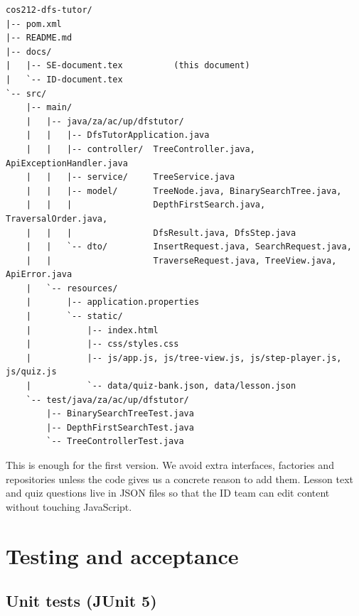 \documentclass[11pt,a4paper]{article}
\begin{document}
\begin{lstlisting}[basicstyle=\ttfamily\footnotesize, backgroundcolor=\color{codebg}, frame=single, rulecolor=\color{black!15}]
cos212-dfs-tutor/
|-- pom.xml
|-- README.md
|-- docs/
|   |-- SE-document.tex          (this document)
|   `-- ID-document.tex
`-- src/
    |-- main/
    |   |-- java/za/ac/up/dfstutor/
    |   |   |-- DfsTutorApplication.java
    |   |   |-- controller/  TreeController.java, ApiExceptionHandler.java
    |   |   |-- service/     TreeService.java
    |   |   |-- model/       TreeNode.java, BinarySearchTree.java,
    |   |   |                DepthFirstSearch.java, TraversalOrder.java,
    |   |   |                DfsResult.java, DfsStep.java
    |   |   `-- dto/         InsertRequest.java, SearchRequest.java,
    |   |                    TraverseRequest.java, TreeView.java, ApiError.java
    |   `-- resources/
    |       |-- application.properties
    |       `-- static/
    |           |-- index.html
    |           |-- css/styles.css
    |           |-- js/app.js, js/tree-view.js, js/step-player.js, js/quiz.js
    |           `-- data/quiz-bank.json, data/lesson.json
    `-- test/java/za/ac/up/dfstutor/
        |-- BinarySearchTreeTest.java
        |-- DepthFirstSearchTest.java
        `-- TreeControllerTest.java
\end{lstlisting}

This is enough for the first version. We avoid extra interfaces, factories and repositories unless
the code gives us a concrete reason to add them. Lesson text and quiz questions live in JSON files
so that the ID team can edit content without touching JavaScript.

\section{Testing and acceptance}

\subsection{Unit tests (JUnit 5)}
\end{document}
